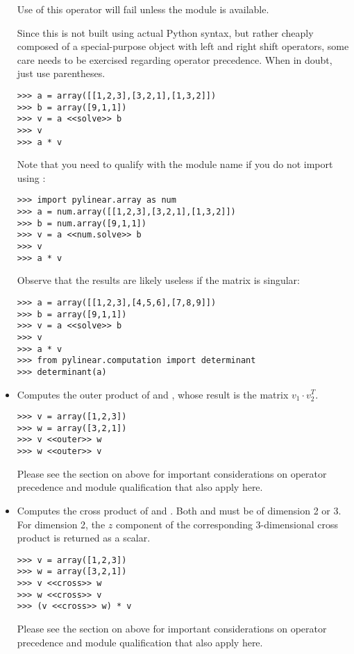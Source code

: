 \begin{itemize}
  Use of this operator will fail unless the module
   is available.

  Since this is not built using actual Python syntax, but rather cheaply
  composed of a special-purpose  object with left and right
  shift operators, some care needs to be exercised regarding operator
  precedence. When in doubt, just use parentheses.

\begin{verbatim}
>>> a = array([[1,2,3],[3,2,1],[1,3,2]])
>>> b = array([9,1,1])
>>> v = a <<solve>> b
>>> v
>>> a * v
\end{verbatim}

  Note that you need to qualify  with the module name if you
  do not import  using :

\begin{verbatim}
>>> import pylinear.array as num
>>> a = num.array([[1,2,3],[3,2,1],[1,3,2]])
>>> b = num.array([9,1,1])
>>> v = a <<num.solve>> b
>>> v
>>> a * v
\end{verbatim}

  Observe that the results are likely useless if the matrix
  is singular:

\begin{verbatim}
>>> a = array([[1,2,3],[4,5,6],[7,8,9]])
>>> b = array([9,1,1])
>>> v = a <<solve>> b
>>> v
>>> a * v
>>> from pylinear.computation import determinant
>>> determinant(a)
\end{verbatim}

\item {}
  
  Computes the outer product of  and ,
  whose result is the matrix $v_1 \cdot v_2^T$.

\begin{verbatim}
>>> v = array([1,2,3])
>>> w = array([3,2,1])
>>> v <<outer>> w
>>> w <<outer>> v
\end{verbatim}

  Please see the section on  above for important
  considerations on operator precedence and module qualification
  that also apply here.

\item {}
  
  Computes the cross product of  and .
  Both  and  must be of dimension 2 or 3.
  For dimension 2, the $z$ component of the corresponding 3-dimensional
  cross product is returned as a scalar.

\begin{verbatim}
>>> v = array([1,2,3])
>>> w = array([3,2,1])
>>> v <<cross>> w
>>> w <<cross>> v
>>> (v <<cross>> w) * v
\end{verbatim}

  Please see the section on  above for important
  considerations on operator precedence and module qualification
  that also apply here.

\end{itemize}
